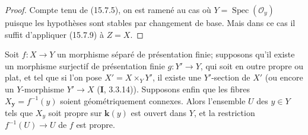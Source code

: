 \begin{proof}
Compte tenu de (15.7.5), on est ramené au cas où $Y=\operatorname{Spec}(\mathcal O_y)$ puisque les hypothèses sont stables par changement de base. Mais dans ce cas il suffit d'appliquer (15.7.9) à $Z=X$.
\end{proof}

\begin{corollary}[15.7.11]
\label{IV.15.7.11-fr}
Soit $f:X\to Y$ un morphisme séparé de présentation finie; supposons qu'il existe un morphisme surjectif de présentation finie $g:Y'\to Y$, qui soit en outre propre \textup{ou} plat, et tel que si l'on pose $X'=X\times_Y Y'$, il existe une $Y'$-section de $X'$ (ou encore un $Y$-morphisme $Y'\to X$ \textup{(\textbf{I}, 3.3.14)}). Supposons enfin que les fibres $X_{\boldsymbol{y}}=f^{-1}(y)$ soient géométriquement connexes. Alors l'ensemble $U$ des $y\in Y$ tels que $X_y$ soit propre sur $\boldsymbol{k}(y)$ est ouvert dans $Y$, et la restriction $f^{-1}(U)\to U$ de $f$ est propre.
\end{corollary}

